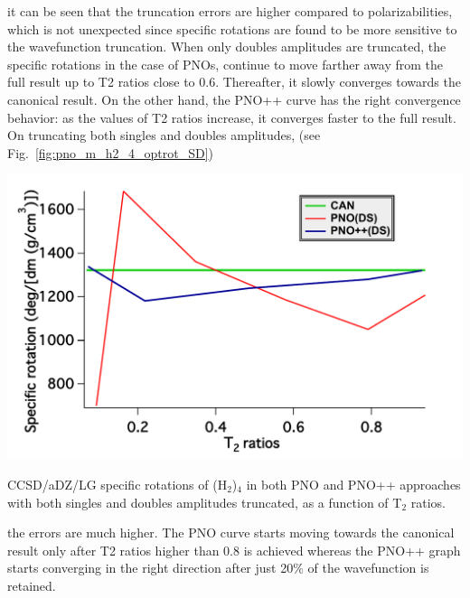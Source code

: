it can be seen that the truncation errors are higher compared to polarizabilities, which is not 
unexpected since specific rotations are found to be more sensitive to the wavefunction truncation.
When only doubles amplitudes are truncated, the specific rotations in the case of PNOs, continue 
to move farther away from the full result up to T2 ratios close to 0.6. Thereafter, it slowly 
converges towards the canonical result. On the other hand, the PNO++ curve has the right
convergence behavior: as the values of T2 ratios increase, it converges faster to the full result.
On truncating both singles and doubles amplitudes, (see Fig.~\ref{fig:pno_m_h2_4_optrot_SD})
\begin{MyFigure}[h!]
\centering
\includegraphics[width=0.6\linewidth,natwidth=610,natheight=642]{figures_pno++/h2_4_optrot_lg_DS.pdf}
\caption{{\footnotesize CCSD/aDZ/LG specific rotations of (H$_2$)$_4$ in both PNO and PNO++ approaches
with both singles and doubles amplitudes truncated, as a function of T$_2$ ratios.}}
\label{fig:pno_m_h2_4_optrot_SD}
\end{MyFigure}
the errors are much higher. The PNO curve starts moving towards the canonical result only 
after T2 ratios higher than 0.8 is achieved whereas the PNO++ graph starts converging
in the right direction after just 20\% of the wavefunction is retained.

